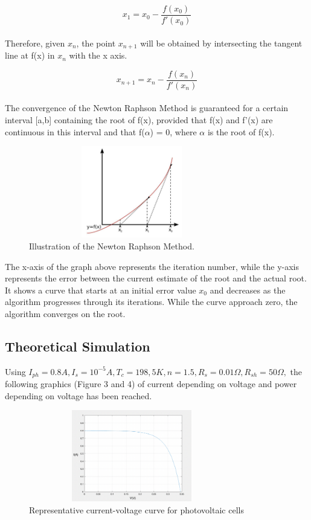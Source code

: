 \documentclass{report}
\begin{document}
\begin{equation}
x_{1} = x_{0} - \frac{f(x_{0})}{f'(x_{0})}
\end{equation}
\\
Therefore, given $x_{n}$, the point $x_{n+1}$ will be obtained by intersecting the tangent line at f(x) in $x_{n}$ with the x axis.

\begin{equation}
x_{n+1} = x_{n} - \frac{f(x_{n})}{f'(x_{n})}
\end{equation}
\\
The convergence of the Newton Raphson Method is
guaranteed for a certain interval [a,b] containing the root of f(x), provided that f(x) and f'(x) are continuous in this interval and that f($\alpha$) = 0, where $\alpha$ is the root of f(x).

\begin{figure}[h!]
    \centering
    \includegraphics[width=9cm, height=4cm] {d.png}
    \caption{Illustration of the Newton Raphson Method\cite{nr2}.}
    \label{fig:my_label}
\end{figure}
\hfill \break
The x-axis of the graph above represents the iteration number, while the y-axis represents the error between the current estimate of the root and the actual root. It shows a curve that starts at an initial error value $x_{0}$ and decreases as the algorithm progresses through its iterations. While the curve approach zero, the algorithm converges on the root.
\subsection{Theoretical Simulation}
Using \begin{math} I_{ph}=0.8 A, I_{s}=10^{-5}A, T_{c}=198,5 K, n=1.5, R_{s}=0.01 \Omega, R_{sh}=50 \Omega, \end{math} the following graphics (Figure 3 and 4) of current depending on voltage and power depending on voltage has been reached.
\begin{figure}[h!]
    \centering
    \includegraphics[width=9cm, height=4cm] {IV.png}
    \caption{Representative current-voltage curve for photovoltaic cells}
    \label{fig:my_label}
\end{figure}
\end{document}
